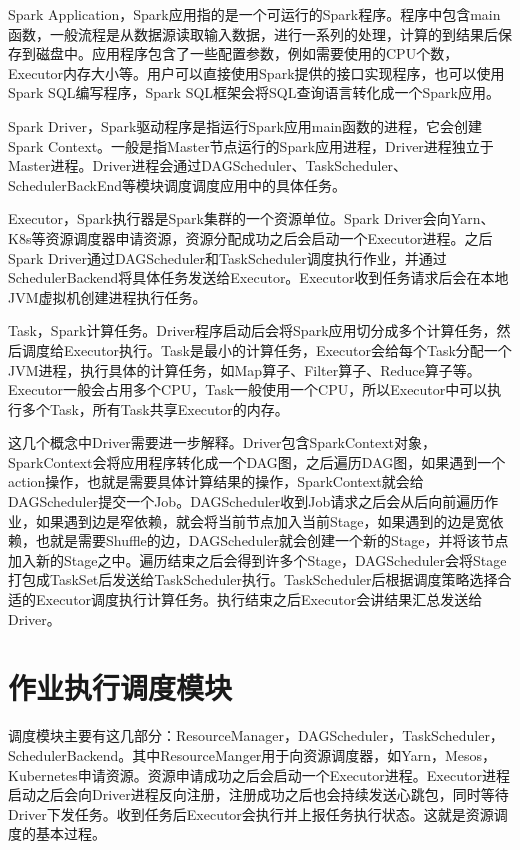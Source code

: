 Spark Application，Spark应用指的是一个可运行的Spark程序。程序中包含main函数，一般流程是从数据源读取输入数据，进行一系列的处理，计算的到结果后保存到磁盘中。应用程序包含了一些配置参数，例如需要使用的CPU个数，Executor内存大小等。用户可以直接使用Spark提供的接口实现程序，也可以使用Spark SQL编写程序，Spark SQL框架会将SQL查询语言转化成一个Spark应用。

Spark Driver，Spark驱动程序是指运行Spark应用main函数的进程，它会创建Spark Context。一般是指Master节点运行的Spark应用进程，Driver进程独立于Master进程。Driver进程会通过DAGScheduler、TaskScheduler、SchedulerBackEnd等模块调度调度应用中的具体任务。

Executor，Spark执行器是Spark集群的一个资源单位。Spark Driver会向Yarn、K8s等资源调度器申请资源，资源分配成功之后会启动一个Executor进程。之后Spark Driver通过DAGScheduler和TaskScheduler调度执行作业，并通过SchedulerBackend将具体任务发送给Executor。Executor收到任务请求后会在本地JVM虚拟机创建进程执行任务。

Task，Spark计算任务。Driver程序启动后会将Spark应用切分成多个计算任务，然后调度给Executor执行。Task是最小的计算任务，Executor会给每个Task分配一个JVM进程，执行具体的计算任务，如Map算子、Filter算子、Reduce算子等。Executor一般会占用多个CPU，Task一般使用一个CPU，所以Executor中可以执行多个Task，所有Task共享Executor的内存。

这几个概念中Driver需要进一步解释。Driver包含SparkContext对象，SparkContext会将应用程序转化成一个DAG图，之后遍历DAG图，如果遇到一个action操作，也就是需要具体计算结果的操作，SparkContext就会给DAGScheduler提交一个Job。DAGScheduler收到Job请求之后会从后向前遍历作业，如果遇到边是窄依赖，就会将当前节点加入当前Stage，如果遇到的边是宽依赖，也就是需要Shuffle的边，DAGScheduler就会创建一个新的Stage，并将该节点加入新的Stage之中。遍历结束之后会得到许多个Stage，DAGScheduler会将Stage打包成TaskSet后发送给TaskScheduler执行。TaskScheduler后根据调度策略选择合适的Executor调度执行计算任务。执行结束之后Executor会讲结果汇总发送给Driver。

\section{作业执行调度模块}

调度模块主要有这几部分：ResourceManager，DAGScheduler，TaskScheduler，SchedulerBackend。其中ResourceManger用于向资源调度器，如Yarn，Mesos，Kubernetes申请资源。资源申请成功之后会启动一个Executor进程。Executor进程启动之后会向Driver进程反向注册，注册成功之后也会持续发送心跳包，同时等待Driver下发任务。收到任务后Executor会执行并上报任务执行状态。这就是资源调度的基本过程。

